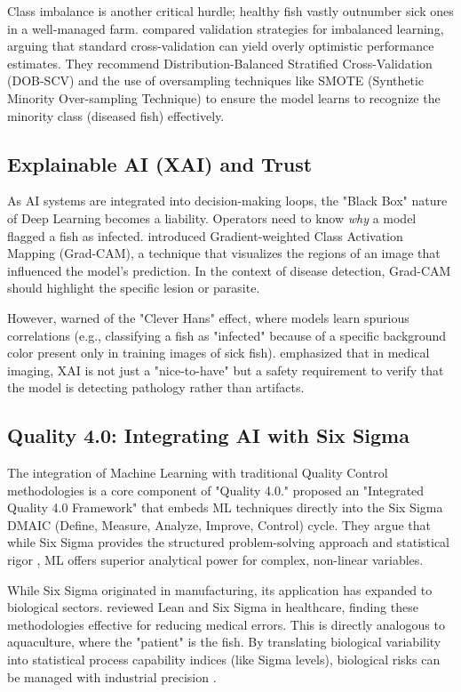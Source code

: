 \documentclass[12pt,a4paper]{article}
\begin{document}
Class imbalance is another critical hurdle; healthy fish vastly outnumber sick ones in a well-managed farm. \cite{s23042333} compared validation strategies for imbalanced learning, arguing that standard cross-validation can yield overly optimistic performance estimates. They recommend Distribution-Balanced Stratified Cross-Validation (DOB-SCV) and the use of oversampling techniques like SMOTE (Synthetic Minority Over-sampling Technique) to ensure the model learns to recognize the minority class (diseased fish) effectively.

\subsection{Explainable AI (XAI) and Trust}
As AI systems are integrated into decision-making loops, the "Black Box" nature of Deep Learning becomes a liability. Operators need to know \emph{why} a model flagged a fish as infected. \cite{selvaraju2017gradcamdidsaythat} introduced Gradient-weighted Class Activation Mapping (Grad-CAM), a technique that visualizes the regions of an image that influenced the model's prediction. In the context of disease detection, Grad-CAM should highlight the specific lesion or parasite.

However, \cite{Lapuschkin2019} warned of the "Clever Hans" effect, where models learn spurious correlations (e.g., classifying a fish as "infected" because of a specific background color present only in training images of sick fish). \cite{CHEN2025109507} emphasized that in medical imaging, XAI is not just a "nice-to-have" but a safety requirement to verify that the model is detecting pathology rather than artifacts.

\subsection{Quality 4.0: Integrating AI with Six Sigma}
The integration of Machine Learning with traditional Quality Control methodologies is a core component of "Quality 4.0." \cite{10.1108/TQM-11-2023-0361} proposed an "Integrated Quality 4.0 Framework" that embeds ML techniques directly into the Six Sigma DMAIC (Define, Measure, Analyze, Improve, Control) cycle. They argue that while Six Sigma provides the structured problem-solving approach and statistical rigor \citep{montgomery2020introduction}, ML offers superior analytical power for complex, non-linear variables.

While Six Sigma originated in manufacturing, its application has expanded to biological sectors. \cite{Henrique17022020} reviewed Lean and Six Sigma in healthcare, finding these methodologies effective for reducing medical errors. This is directly analogous to aquaculture, where the "patient" is the fish. By translating biological variability into statistical process capability indices (like Sigma levels), biological risks can be managed with industrial precision \citep{Tsung2023}.
\end{document}
